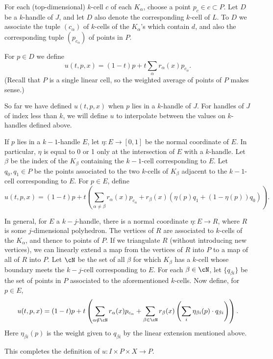 \documentclass[11pt,leqno]{amsart}
\def\sub{\subset}
\newcommand{\eq}[1]{\begin{displaymath}#1\end{displaymath}}
\begin{document}
For each (top-dimensional) $k$-cell $c$ of each $K_\alpha$, choose a point $p_c \in c \sub P$.
Let $D$ be a $k$-handle of $J$, and let $D$ also denote the corresponding
$k$-cell of $L$.
To $D$ we associate the tuple $(c_\alpha)$ of $k$-cells of the $K_\alpha$'s
which contain $d$, and also the corresponding tuple $(p_{c_\alpha})$ of points in $P$.

For $p \in D$ we define
\eq{
    u(t, p, x) = (1-t)p + t \sum_\alpha r_\alpha(x) p_{c_\alpha} .
}
(Recall that $P$ is a single linear cell, so the weighted average of points of $P$
makes sense.)

So far we have defined $u(t, p, x)$ when $p$ lies in a $k$-handle of $J$.
For handles of $J$ of index less than $k$, we will define $u$ to
interpolate between the values on $k$-handles defined above.

If $p$ lies in a $k{-}1$-handle $E$, let $\eta : E \to [0,1]$ be the normal coordinate
of $E$.
In particular, $\eta$ is equal to 0 or 1 only at the intersection of $E$
with a $k$-handle.
Let $\beta$ be the index of the $K_\beta$ containing the $k{-}1$-cell
corresponding to $E$.
Let $q_0, q_1 \in P$ be the points associated to the two $k$-cells of $K_\beta$
adjacent to the $k{-}1$-cell corresponding to $E$.
For $p \in E$, define
\eq{
    u(t, p, x) = (1-t)p + t \left( \sum_{\alpha \ne \beta} r_\alpha(x) p_{c_\alpha}
            + r_\beta(x) (\eta(p) q_1 + (1-\eta(p)) q_0) \right) .
}

In general, for $E$ a $k{-}j$-handle, there is a normal coordinate
$\eta: E \to R$, where $R$ is some $j$-dimensional polyhedron.
The vertices of $R$ are associated to $k$-cells of the $K_\alpha$, and thence to points of $P$.
If we triangulate $R$ (without introducing new vertices), we can linearly extend
a map from the vertices of $R$ into $P$ to a map of all of $R$ into $P$.
Let $\cN$ be the set of all $\beta$ for which $K_\beta$ has a $k$-cell whose boundary meets
the $k{-}j$-cell corresponding to $E$.
For each $\beta \in \cN$, let $\{q_{\beta i}\}$ be the set of points in $P$ associated to the aforementioned $k$-cells.
Now define, for $p \in E$,
\eq{
    u(t, p, x) = (1-t)p + t \left(
            \sum_{\alpha \notin \cN} r_\alpha(x) p_{c_\alpha}
                + \sum_{\beta \in \cN} r_\beta(x) \left( \sum_i \eta_{\beta i}(p) \cdot q_{\beta i} \right)
             \right) .
}
Here $\eta_{\beta i}(p)$ is the weight given to $q_{\beta i}$ by the linear extension
mentioned above.

This completes the definition of $u: I \times P \times X \to P$.
\end{document}
